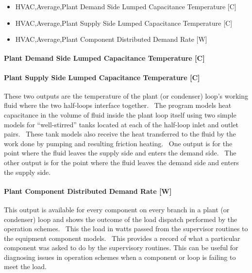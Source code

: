 \begin{itemize}
\item
  HVAC,Average,Plant Demand Side Lumped Capacitance Temperature {[}C{]}
\item
  HVAC,Average,Plant Supply Side Lumped Capacitance Temperature {[}C{]}
\item
  HVAC,Average,Plant Component Distributed Demand Rate {[}W{]}
\end{itemize}

\paragraph{Plant Demand Side Lumped Capacitance Temperature {[}C{]}}\label{plant-demand-side-lumped-capacitance-temperature-c}

\paragraph{Plant Supply Side Lumped Capacitance Temperature {[}C{]}}\label{plant-supply-side-lumped-capacitance-temperature-c}

These two outputs are the temperature of the plant (or condenser) loop's working fluid where the two half-loops interface together.~ The program models heat capacitance in the volume of fluid inside the plant loop itself using two simple models for ``well-stirred'' tanks located at each of the half-loop inlet and outlet pairs.~ These tank models also receive the heat transferred to the fluid by the work done by pumping and resulting friction heating.~ One output is for the point where the fluid leaves the supply side and enters the demand side.~ The other output is for the point where the fluid leaves the demand side and enters the supply side.

\paragraph{Plant Component Distributed Demand Rate {[}W{]}}\label{plant-component-distributed-demand-rate-w}

This output is available for every component on every branch in a plant (or condenser) loop and shows the outcome of the load dispatch performed by the operation schemes.~ This the load in watts passed from the supervisor routines to the equipment component models.~ This provides a record of what a particular component was asked to do by the supervisory routines. This can be useful for diagnosing issues in operation schemes when a component or loop is failing to meet the load.

